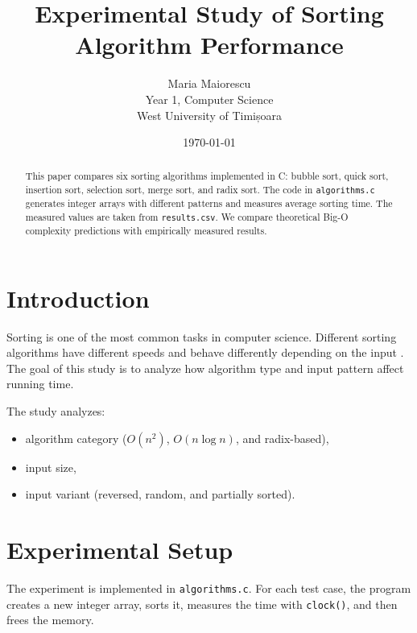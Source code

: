 \documentclass[11pt,a4paper]{article}
\title{Experimental Study of Sorting Algorithm Performance}
\author{Maria Maiorescu \\[4pt]
\small{Year 1, Computer Science} \\
\small{West University of Timișoara}}
\date{\today}
\begin{document}
\maketitle

\begin{abstract}
This paper compares six sorting algorithms implemented in C: bubble sort, quick sort, insertion sort, selection sort, merge sort, and radix sort. The code in \texttt{algorithms.c} generates integer arrays with different patterns and measures average sorting time. The measured values are taken from \texttt{results.csv}. We compare theoretical Big-O complexity predictions with empirically measured results.
\end{abstract}

\section{Introduction}
Sorting is one of the most common tasks in computer science. Different sorting algorithms have different speeds and behave differently depending on the input \cite{cormen2009,sedgewick2011}. The goal of this study is to analyze how algorithm type and input pattern affect running time.

The study analyzes:
\begin{itemize}
    \item algorithm category (\(O(n^2)\), \(O(n\log n)\), and radix-based),
    \item input size,
    \item input variant (reversed, random, and partially sorted).
\end{itemize}

\section{Experimental Setup}
The experiment is implemented in \texttt{algorithms.c}. For each test case, the program creates a new integer array, sorts it, measures the time with \texttt{clock()}, and then frees the memory.
\end{document}
